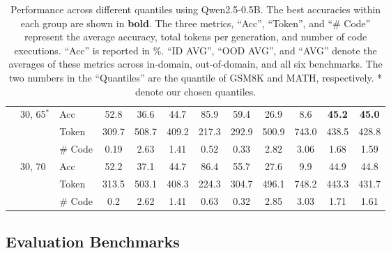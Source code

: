 \begin{table*}[htbp!]
{\begin{tabular}{@{}lllccccccccc@{}}
 & \multirow{3}{*}{30, 65$^*$} & Acc & 52.8 & 36.6 & \multicolumn{1}{c|}{44.7} & 85.9 & 59.4 & 26.9 & 8.6 & \multicolumn{1}{c|}{\textbf{45.2}} & \textbf{45.0} \\
 &  & Token & 309.7 & 508.7 & \multicolumn{1}{c|}{409.2} & 217.3 & 292.9 & 500.9 & 743.0 & \multicolumn{1}{c|}{438.5} & 428.8 \\
 &  & \# Code & 0.19 & 2.63 & \multicolumn{1}{c|}{1.41} & 0.52 & 0.33 & 2.82 & 3.06 & \multicolumn{1}{c|}{1.68} & 1.59 \\ \cmidrule(l){2-12} 
 & \multirow{3}{*}{30, 70} & Acc & 52.2 & 37.1 & \multicolumn{1}{c|}{44.7} & 86.4 & 55.7 & 27.6 & 9.9 & \multicolumn{1}{c|}{44.9} & 44.8\\
 & & Token & 313.5 & 503.1 & \multicolumn{1}{c|}{408.3} & 224.3 & 304.7 & 496.1 & 748.2 & \multicolumn{1}{c|}{443.3} & 431.7\\
 & & \# Code & 0.2 & 2.62 & \multicolumn{1}{c|}{1.41} & 0.63 & 0.32 & 2.85 & 3.03 & \multicolumn{1}{c|}{1.71} & 1.61\\
\bottomrule
\end{tabular}
  }
  \caption{Performance across different quantiles using Qwen2.5-0.5B. The best accuracies within each group are shown in \textbf{bold}.
  The three metrics, ``Acc'', ``Token'', and ``\# Code'' represent the average accuracy, total tokens per generation, and number of code executions. 
  ``Acc'' is reported in \%. ``ID AVG'', ``OOD AVG'', and ``AVG'' denote the averages of these metrics across in-domain, out-of-domain, and all six benchmarks. The two numbers in the ``Quantiles'' are the quantile of GSM8K and MATH, respectively. * denote our chosen quantiles.}
  \label{tabapp:threshold}
\end{table*}




\subsection{Evaluation Benchmarks}\label{app:benchmarks}




